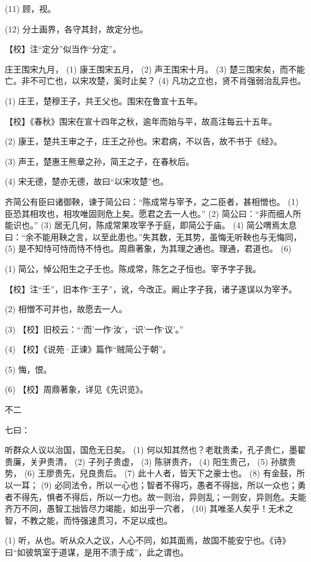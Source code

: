 \documentclass[12pt,UTF8]{ctexbook}
\begin{document}
(11) 顾，视。

(12) 分土画界，各守其封，故定分也。

【校】注“定分”似当作“分定”。

庄王围宋九月， (1) 康王围宋五月， (2) 声王围宋十月。 (3) 楚三围宋矣，而不能亡。非不可亡也，以宋攻楚，奚时止矣？ (4) 凡功之立也，贤不肖强弱治乱异也。

(1) 庄王，楚穆王子，共王父也。围宋在鲁宣十五年。

【校】《春秋》围宋在宣十四年之秋，逾年而始与平，故高注每云十五年。

(2) 康王，楚共王审之子，庄王之孙也。宋君病，不以告，故不书于《经》。

(3) 声王，楚惠王熊章之孙，简王之子，在春秋后。

(4) 宋无德，楚亦无德，故曰“以宋攻楚”也。

齐简公有臣曰诸御鞅，谏于简公曰：“陈成常与宰予，之二臣者，甚相憎也。 (1) 臣恐其相攻也，相攻唯固则危上矣。愿君之去一人也。” (2) 简公曰：“非而细人所能识也。” (3) 居无几何，陈成常果攻宰予于庭，即简公于庙。 (4) 简公喟焉太息曰：“余不能用鞅之言，以至此患也。”失其数，无其势，虽悔无听鞅也与无悔同， (5) 是不知恃可恃而恃不恃也。周鼎著象，为其理之通也。理通，君道也。 (6)

(1) 简公，悼公阳生之子壬也。陈成常，陈乞之子恒也。宰予字子我。

【校】注“壬”，旧本作“王子”，讹，今改正。阚止字子我，诸子遂误以为宰予。

(2) 相憎不可并也，故愿去一人。

(3) 【校】旧校云：“‘而’一作‘汝’，‘识’一作‘议’。”

(4) 【校】《说苑·正谏》篇作“贼简公于朝”。

(5) 悔，恨。

(6) 【校】周鼎著象，详见《先识览》。





不二


七曰：

听群众人议以治国，国危无日矣。 (1) 何以知其然也？老耽贵柔，孔子贵仁，墨翟贵廉，关尹贵清， (2) 子列子贵虚， (3) 陈骈贵齐， (4) 阳生贵己， (5) 孙膑贵势， (6) 王廖贵先，兒良贵后。 (7) 此十人者，皆天下之豪士也。 (8) 有金鼓，所以一耳； (9) 必同法令，所以一心也；智者不得巧，愚者不得拙，所以一众也；勇者不得先，惧者不得后，所以一力也。故一则治，异则乱；一则安，异则危。夫能齐万不同，愚智工拙皆尽力竭能，如出乎一穴者， (10) 其唯圣人矣乎！无术之智，不教之能，而恃强速贯习，不足以成也。

(1) 听，从也。听从众人之议，人心不同，如其面焉，故国不能安宁也。《诗》曰“如彼筑室于道谋，是用不溃于成”，此之谓也。
\end{document}
